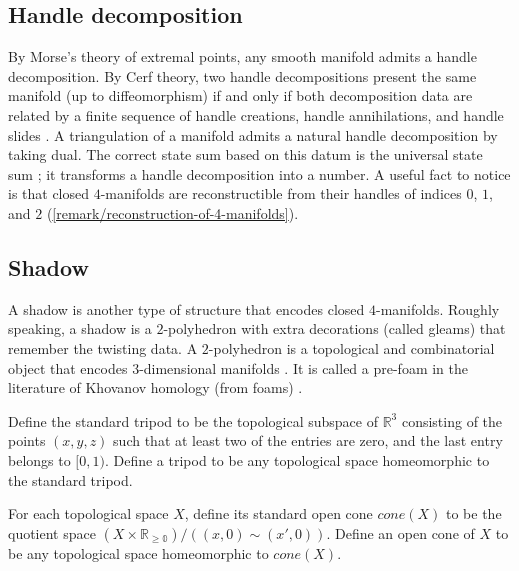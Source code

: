 \subsection{Handle decomposition}

\noindent By Morse's theory of extremal points, any smooth
manifold admits a handle decomposition. By Cerf theory, two
handle decompositions present the same manifold (up to
diffeomorphism) if and only if both decomposition data are
related by a finite sequence of handle creations, handle
annihilations, and handle slides
\cite{gompf-stipsicz/4-manifolds-and-kirby-calculus}. A
triangulation of a manifold admits a natural handle decomposition
by taking dual. The correct state sum based on this datum is the
universal state sum \cite{walker/universal-state-sum}; it
transforms a handle decomposition into a number. A useful fact to
notice is that closed $4$-manifolds are reconstructible from
their handles of indices $0$, $1$, and $2$
(\ref{remark/reconstruction-of-4-manifolds}).

\subsection{Shadow}


\noindent A shadow is another type of structure that encodes
closed $4$-manifolds. Roughly speaking, a shadow is a
$2$-polyhedron with extra decorations (called gleams) that
remember the twisting data. A $2$-polyhedron is a topological and
combinatorial object that encodes $3$-dimensional manifolds
\cite{matveev/algorithmic-topology-and-classification-of-3-manifolds}.
It is called a pre-foam in the literature of Khovanov homology
(from foams) \cite{khovanov-robert/foam}.

\begin{definition}[tripod]\label{def/tripod}
  Define the standard tripod to be the topological subspace of
  $\mathbb{R}^{3}$ consisting of the points $(x,y,z)$ such that
  at least two of the entries are zero, and the last entry
  belongs to $[0,1)$. Define a tripod to be any topological space
  homeomorphic to the standard tripod.
\end{definition}

\begin{definition}[cone]\label{def/cone}
  For each topological space $X$, define its standard open cone
  $cone(X)$ to be the quotient space
  $(X \times \mathbb{R_{\geq 0}})/((x,0) \sim (x',0)).$ Define an
  open cone of $X$ to be any topological space homeomorphic to
  $cone(X)$.
\end{definition}

